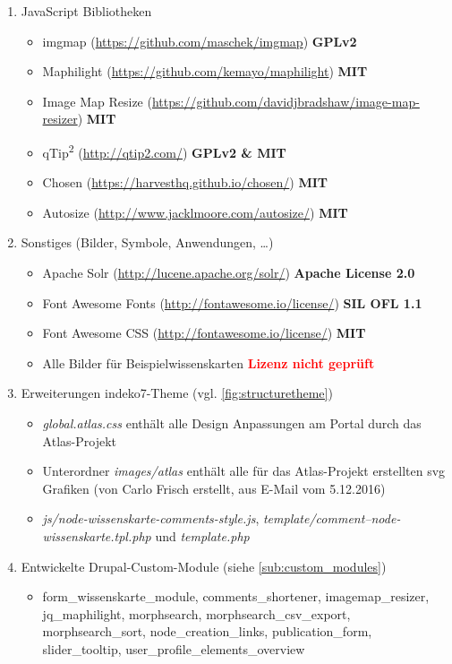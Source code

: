 \begin{enumerate}
	\item JavaScript Bibliotheken
	\begin{itemize}
		\item imgmap (\url{https://github.com/maschek/imgmap})  \textbf{GPLv2}
		\item Maphilight (\url{https://github.com/kemayo/maphilight}) \textbf{MIT}
		\item Image Map Resize (\url{https://github.com/davidjbradshaw/image-map-resizer}) \textbf{MIT}
		\item qTip\textsuperscript{2} (\url{http://qtip2.com/}) \textbf{GPLv2 \& MIT}
		\item Chosen (\url{https://harvesthq.github.io/chosen/}) \textbf{MIT}
		\item Autosize (\url{http://www.jacklmoore.com/autosize/}) \textbf{MIT}
	\end{itemize}

	\item Sonstiges (Bilder, Symbole, Anwendungen, \dots\label{sub:license_images})
	\begin{itemize}
		\item Apache Solr (\url{http://lucene.apache.org/solr/}) \textbf{Apache License 2.0}
		\item Font Awesome Fonts (\url{http://fontawesome.io/license/}) \textbf{SIL OFL 1.1}
		\item Font Awesome CSS (\url{http://fontawesome.io/license/}) \textbf{MIT}
		\item Alle Bilder für Beispielwissenskarten \textcolor{red}{\textbf{Lizenz nicht geprüft}}
	\end{itemize}

	\item Erweiterungen indeko7-Theme (vgl. \cref{fig:structuretheme})
	\begin{itemize}
		\item \textit{global.atlas.css} enthält alle Design Anpassungen am Portal durch das Atlas-Projekt
		\item Unterordner \textit{images/atlas} enthält alle für das Atlas-Projekt erstellten svg Grafiken (von Carlo Frisch erstellt, aus E-Mail vom 5.12.2016)
		\item \textit{js/node-wissenskarte-comments-style.js}, \textit{template/comment--node-wissenskarte.tpl.php} und \textit{template.php}
	\end{itemize}

	\item Entwickelte Drupal-Custom-Module (siehe \cref{sub:custom_modules})
	\begin{itemize}
		\item form\_wissenskarte\_module, comments\_shortener, imagemap\_resizer, jq\_maphilight, morphsearch, morphsearch\_csv\_export, morphsearch\_sort, node\_creation\_links, publication\_form, slider\_tooltip, user\_profile\_elements\_overview
	\end{itemize}
\end{enumerate}


